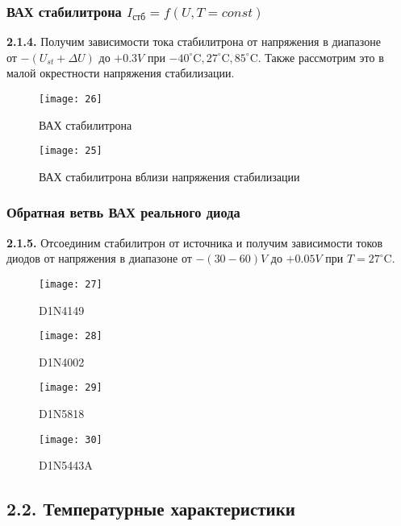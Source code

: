 \documentclass{semi}
\newcommand{\Cd}{^{\circ}\mathrm{C}}
\begin{document}
\newpage

\subsubsection*{ВАХ стабилитрона $ I_{стб} = f(U, T = const) $}

\textbf{{\normalsize 2.1.4.}}
Получим зависимости тока стабилитрона от напряжения в диапазоне\\
от $ -(U_{st} + \Delta U) $ до $ +0.3V $ при $ -40 \Cd, 27 \Cd, 85 \Cd $. Также рассмотрим это в малой окрестности напряжения стабилизации.
\begin{figure}[H]
	\centering
	\texttt{[image: 26]}
	\caption{ВАХ стабилитрона}
	\label{2.1.4_1}
\end{figure}

\begin{figure}[H]
	\centering
	\texttt{[image: 25]}
	\caption{ВАХ стабилитрона вблизи напряжения стабилизации}
	\label{2.1.4_2}
\end{figure}

\subsubsection*{Обратная ветвь ВАХ реального диода}

\textbf{{\normalsize 2.1.5.}}
Отсоединим стабилитрон от источника и получим зависимости токов диодов от напряжения в диапазоне от $ -(30-60)V $ до $ +0.05V $ при $ T = 27 \Cd $.
\begin{figure}[H]
	\centering
	\texttt{[image: 27]}
	\caption{D1N4149}
	\label{2.1.5_1}
\end{figure}

\begin{figure}[H]
	\centering
	\texttt{[image: 28]}
	\caption{D1N4002}
	\label{2.1.5_2}
\end{figure}

\begin{figure}[H]
	\centering
	\texttt{[image: 29]}
	\caption{D1N5818}
	\label{2.1.5_3}
\end{figure}

\begin{figure}[H]
	\centering
	\texttt{[image: 30]}
	\caption{D1N5443A}
	\label{2.1.5_4}
\end{figure}



\subsection*{2.2. Температурные характеристики}
\end{document}
